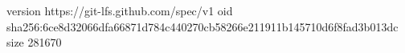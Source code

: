 version https://git-lfs.github.com/spec/v1
oid sha256:6ce8d32066dfa66871d784c440270cb58266e211911b145710d6f8fad3b013dc
size 281670
